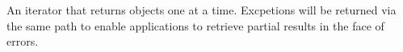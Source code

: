 An iterator that returns objects one at a time.  Excpetions will be returned via
the same path to enable applications to retrieve partial results in the face of
errors.
